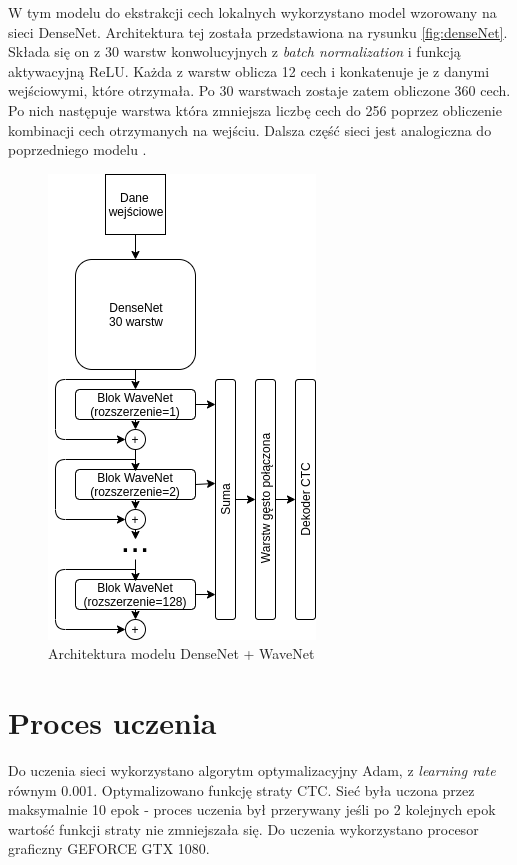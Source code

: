 \documentclass[a4paper,11pt,twoside]{report}
\theoremstyle{definition}
\begin{document}
W tym modelu do ekstrakcji cech lokalnych wykorzystano model wzorowany na sieci DenseNet\cite{denseNet}. Architektura tej została przedstawiona na rysunku \ref{fig:denseNet}. Składa się on z 30 warstw konwolucyjnych z \textit{batch normalization} i funkcją aktywacyjną ReLU. Każda z warstw oblicza 12 cech i konkatenuje je z danymi wejściowymi, które otrzymała. Po 30 warstwach zostaje zatem obliczone 360 cech. Po nich następuje warstwa która zmniejsza liczbę cech do 256 poprzez obliczenie kombinacji cech otrzymanych na wejściu. Dalsza część sieci jest analogiczna do poprzedniego modelu
. 
\begin{figure}[h!]
	\centering
	\includegraphics[scale=0.7]{denseWaveNet}
	\caption{Architektura modelu DenseNet + WaveNet}
\end{figure}

\section{Proces uczenia}

Do uczenia sieci wykorzystano algorytm optymalizacyjny Adam\cite{adam}, z \textit{learning rate} równym 0.001. Optymalizowano funkcję straty CTC\cite{ctc}. Sieć była uczona przez maksymalnie 10 epok - proces uczenia był przerywany jeśli po 2 kolejnych epok wartość funkcji straty nie zmniejszała się. Do uczenia wykorzystano procesor graficzny GEFORCE GTX 1080.
\end{document}
